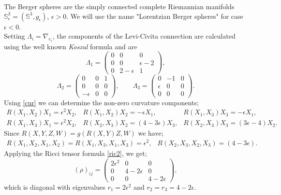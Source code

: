 \documentclass[11pt,oneside,leqno]{amsart}
\theoremstyle{plain}
\begin{document}
The Berger spheres are the simply connected complete Riemannian manifolds ${{\mathbb S}}_{\epsilon}^3=({{\mathbb S}}^3,g_{\epsilon})$, $\epsilon>0$. We will use the name "Lorentzian Berger spheres" for case $\epsilon<0$. \\
Setting $\Lambda_i=\nabla_{e_i}$, the components of the Levi-Civita connection are calculated using the well known {\em Koszul} formula and are
\begin{equation}
 \Lambda_1= \left( \begin{array}{ccc}
   0 & 0 & 0   \\
   0 & 0 & \epsilon -2   \\
   0 & 2-\epsilon & 1  
   \end{array}  \right),
   \end{equation}
  $$
   \Lambda_2= \left( \begin{array}{ccc}
   0 & 0 & 1   \\
   0 & 0 & 0   \\
   -\epsilon & 0 & 0  
   \end{array}  \right), \quad \quad 
   \Lambda_3= \left( \begin{array}{ccc}
   0 & -1 & 0   \\
   \epsilon & 0 & 0   \\
   0 & 0 & 0 
   \end{array}  \right).
$$
Using \eqref{cur} we can determine the non-zero curvature components;
$$
 \begin{array}{ccc}
   R(X_1,X_2)X_1=\epsilon^2 X_2 ,& R(X_1,X_2)X_2=-\epsilon X_1,& R(X_1,X_3)X_3=-\epsilon X_1,  \\
   R(X_1,X_3)X_1=\epsilon^2 X_3, & R(X_2,X_3)X_2=(4-3\epsilon)X_3 ,& R(X_2,X_3)X_3=(3\epsilon-4)X_2.
     \end{array} 
    $$
Since $R(X, Y,Z,W) = g(R(X, Y )Z,W)$ we have;
$$
 \begin{array}{cc}
   R(X_1,X_2,X_1, X_2)= R(X_1,X_3,X_1, X_3)=\epsilon^2 ,& R(X_2,X_3,X_2,X_3)=(4-3\epsilon).
     \end{array} 
    $$
Applying the Ricci tensor formula \eqref{ric2}, we get;
\begin{equation}\label{ric3}
(\rho)_{ij}= \left( \begin{array}{ccc}
   2\epsilon^2 & 0 & 0   \\
   0 & 4-2\epsilon & 0   \\
   0 & 0 & 4-2\epsilon  
   \end{array}  \right),
\end{equation}
which is diagonal with eigenvalues $r_1=2\epsilon^2$ and $r_2=r_3=  4-2\epsilon$.\\
\end{document}
